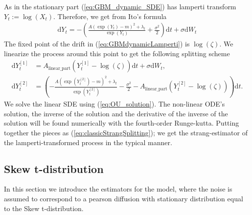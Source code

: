 As in the stationary part (\ref{eq:GBM_dynamic_SDE}) has lamperti transform $Y_t:=\log(X_t)$. Therefore, we get from Ito's formula
\begin{align}
    \mathrm{d}Y_t = - \left(\frac{A\left(\exp\left(Y_t\right)-m\right)^2 + \lambda_t}{\exp(Y_t)} + \frac{\sigma^2}{2}\right)\mathrm{d}t + \sigma \mathrm{d}W_t \label{eq:GBMdynamicLamperti}
\end{align}
The fixed point of the drift in (\ref{eq:GBMdynamicLamperti}) is $\log\left(\zeta\right)$. We linearize the process around this point to get the following splitting scheme
\begin{align}
    \mathrm{d}Y_t^{[1]} &= A_{\mathrm{linear\_part}}\left(Y_t^{[1]} - \log\left(\zeta\right)\right)\mathrm{d}t + \sigma \mathrm{d}W_t,\\
    \mathrm{d}Y_t^{[2]} &= \left(-\frac{A\left(\exp\left(Y_t^{[2]}\right)-m\right)^2 + \lambda_t}{\exp\left(Y_t^{[2]}\right)} - \frac{\sigma^2}{2}%
    - A_{\mathrm{linear\_part}}\left(Y_t^{[2]} - \log\left(\zeta\right)\right)\right)\mathrm{d}t. \label{eq:GBMLampertiBasedStrang}
\end{align}
We solve the linear SDE using (\ref{eq:OU_solution}). The non-linear ODE's solution, the inverse of the solution and the derivative of the inverse of the solution will be found numerically with the fourth-order Runge-kutta. Putting together the pieces as (\ref{eq:classicStrangSplitting}); we get the strang-estimator of the lamperti-transformed process in the typical manner.
\subsection{Skew t-distribution}
In this section we introduce the estimators for the model, where the noise is assumed to correspond to a pearson diffusion with stationary distribution equal to the Skew t-distribution.
